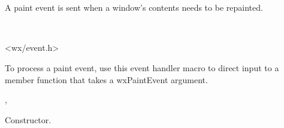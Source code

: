 \section{}\label{wxpaintevent}

A paint event is sent when a window's contents needs to be repainted.


\\


<wx/event.h>


To process a paint event, use this event handler macro to direct input to a member
function that takes a wxPaintEvent argument.

\twocolwidtha{7cm}
\begin{twocollist}\itemsep=0pt
\end{twocollist}%


, 




Constructor.

